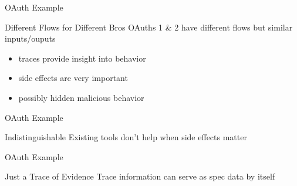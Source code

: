 \begin{frame}{OAuth Example}
  \begin{block}{Different Flows for Different Bros}
    OAuths 1 \& 2 have different flows but similar inputs/ouputs

    \begin{itemize}
      \item traces provide insight into behavior
      \item side effects are very important
      \item possibly hidden malicious behavior
    \end{itemize}
  \end{block}
\end{frame}

\begin{frame}{OAuth Example}
  \begin{block}{Indistinguishable}
    Existing tools don't help when side effects matter

    \begin{example}
      
    \end{example}
  \end{block}
\end{frame}

\begin{frame}{OAuth Example}
  \begin{block}{Just a Trace of Evidence}
    Trace information can serve as spec data by itself

    \begin{example}
      
    \end{example}
  \end{block}
\end{frame}
